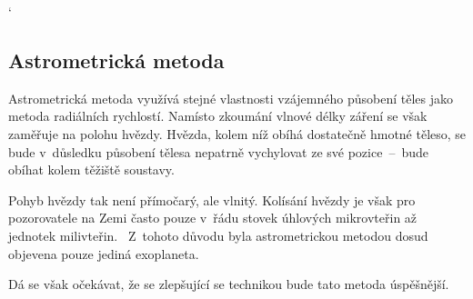 \documentclass[a4paper,12pt]{article}
\begin{document}
{ %
\catcode`

\clearpage
\subsection{Astrometrická metoda}

Astrometrická metoda využívá stejné vlastnosti vzájemného působení těles jako metoda radiálních rychlostí. Namísto zkoumání vlnové délky záření se však zaměřuje na polohu hvězdy. Hvězda, kolem níž obíhá dostatečně hmotné těleso, se bude v~důsledku působení tělesa nepatrně vychylovat ze své pozice~--~bude obíhat kolem těžiště soustavy.~\cite{methods}


Pohyb hvězdy tak není přímočarý, ale vlnitý. Kolísání hvězdy je však pro pozorovatele na Zemi často pouze v~řádu stovek úhlových mikrovteřin až jednotek milivteřin.~\cite{methods} Z~tohoto důvodu byla astrometrickou metodou dosud objevena pouze jediná exoplaneta.~\cite{nasadata}

\drawgimp

Dá se však očekávat, že se zlepšující se technikou bude tato metoda úspěšnější.

}
\end{document}
